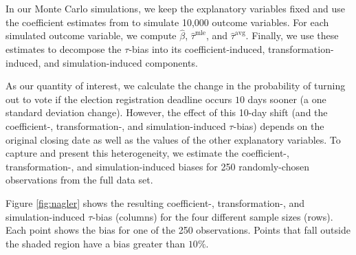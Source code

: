 \documentclass[11pt]{article}
\begin{document}
In our Monte Carlo simulations, we keep the explanatory variables fixed and use the coefficient estimates from \cite{BerryDeMerittEsarey2010} to simulate 10,000 outcome variables. For each simulated outcome variable, we compute $\hat{\beta}$, $\hat{\tau}^\text{mle}$, and $\hat{\tau}^\text{avg}$. Finally, we use these estimates to decompose the $\tau$-bias into its coefficient-induced, transformation-induced, and simulation-induced components.

As our quantity of interest, we calculate the change in the probability of turning out to vote if the election registration deadline occurs $10$ days sooner (a one standard deviation change). 
However, the effect of this 10-day shift (and the coefficient-, transformation-, and simulation-induced $\tau$-bias) depends on the original closing date as well as the values of the other explanatory variables. To capture and present this heterogeneity, we estimate the coefficient-, transformation-, and simulation-induced biases for 250 randomly-chosen observations from the full data set. 

Figure \ref{fig:nagler} shows the resulting coefficient-, transformation-, and simulation-induced $\tau$-bias (columns) for the four different sample sizes (rows). Each point shows the bias for one of the 250 observations. Points that fall outside the shaded region have a bias greater than $10\%$. 
\end{document}
